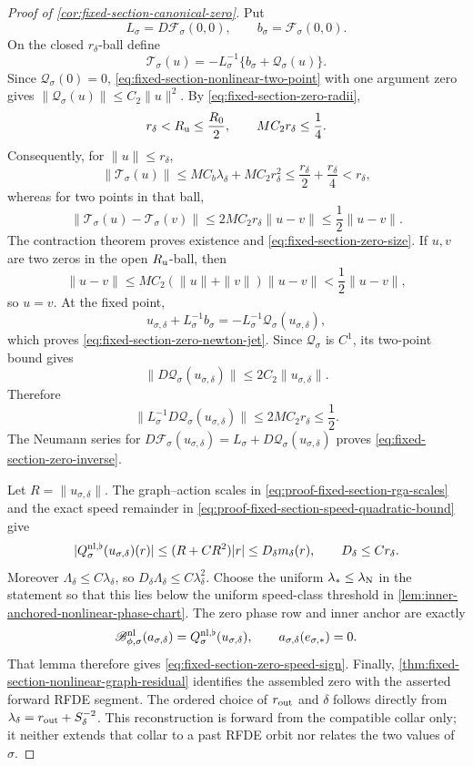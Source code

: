 \begin{proof}[Proof of
\cref{cor:fixed-section-canonical-zero}]
Put
\[
 L_\sigma=D\mathcal F_\sigma(0,0),
 \qquad b_\sigma=\mathcal F_\sigma(0,0).
\]
On the closed \(r_\delta\)-ball define
\begin{equation}
 \mathcal T_\sigma(u)
 =-L_\sigma^{-1}\{b_\sigma+\mathcal Q_\sigma(u)\}. \label{eq:fixed-section-zero-contraction}
\end{equation}
Since \(\mathcal Q_\sigma(0)=0\),
\cref{eq:fixed-section-nonlinear-two-point} with one argument zero gives
\(\|\mathcal Q_\sigma(u)\|\le C_2\|u\|^2\).  By
\cref{eq:fixed-section-zero-radii},
\[
 r_\delta<R_{\rm u}\le\frac{R_0}{2},
 \qquad
 MC_2r_\delta\le\frac14.
\]
Consequently, for \(\|u\|\le r_\delta\),
\[
 \|\mathcal T_\sigma(u)\|
 \le MC_b\lambda_\delta+MC_2r_\delta^2
 \le\frac{r_\delta}{2}+\frac{r_\delta}{4}
 <r_\delta,
\]
whereas for two points in that ball,
\[
 \|\mathcal T_\sigma(u)-\mathcal T_\sigma(v)\|
 \le2MC_2r_\delta\|u-v\|
 \le\frac12\|u-v\|.
\]
The contraction theorem proves existence and
\cref{eq:fixed-section-zero-size}.  If \(u,v\) are two zeros in the open
\(R_{\rm u}\)-ball, then
\[
 \|u-v\|
 \le MC_2(\|u\|+\|v\|)\|u-v\|
 <\frac12\|u-v\|,
\]
so \(u=v\).  At the fixed point,
\[
 u_{\sigma,\delta}+L_\sigma^{-1}b_\sigma
 =-L_\sigma^{-1}\mathcal Q_\sigma(u_{\sigma,\delta}),
\]
which proves \cref{eq:fixed-section-zero-newton-jet}.
Since \(\mathcal Q_\sigma\) is \(C^1\), its two-point bound gives
\[
 \|D\mathcal Q_\sigma(u_{\sigma,\delta})\|
 \le2C_2\|u_{\sigma,\delta}\|.
\]
Therefore
\[
 \|L_\sigma^{-1}
       D\mathcal Q_\sigma(u_{\sigma,\delta})\|
 \le2MC_2r_\delta\le\frac12.
\]
The Neumann series for
\(D\mathcal F_\sigma(u_{\sigma,\delta})
 =L_\sigma+D\mathcal Q_\sigma(u_{\sigma,\delta})\)
proves \cref{eq:fixed-section-zero-inverse}.

Let \(R=\|u_{\sigma,\delta}\|\).  The graph--action scales in
\cref{eq:proof-fixed-section-rga-scales} and the exact speed remainder in
\cref{eq:proof-fixed-section-speed-quadratic-bound} give
\[
 |Q_\sigma^{\rm nl,\flat}(u_{\sigma,\delta})(r)|
 \le (R+CR^2)|r|
 \le D_\delta m_\delta(r),
 \qquad D_\delta\le Cr_\delta.
\]
Moreover
\(\Lambda_\delta\le C\lambda_\delta\), so
\(D_\delta\Lambda_\delta\le C\lambda_\delta^2\).
Choose the uniform \(\lambda_*\le\lambda_{\rm N}\) in the statement so
that this lies below the uniform speed-class threshold in
\cref{lem:inner-anchored-nonlinear-phase-chart}.  The zero phase row and
inner anchor are exactly
\[
 \mathscr B_{\phi,\sigma}^{\rm nl}
       (a_{\sigma,\delta})
 =Q_\sigma^{\rm nl,\flat}(u_{\sigma,\delta}),
 \qquad
 a_{\sigma,\delta}(e_{\sigma,*})=0.
\]
That lemma therefore gives
\cref{eq:fixed-section-zero-speed-sign}.  Finally,
\cref{thm:fixed-section-nonlinear-graph-residual} identifies the assembled
zero with the asserted forward RFDE segment.  The ordered choice of
\(r_{\rm out}\) and \(\delta\) follows directly from
\(\lambda_\delta=r_{\rm out}+S_\delta^{-2}\).
This reconstruction is forward from the compatible collar only; it neither
extends that collar to a past RFDE orbit nor relates the two values of
\(\sigma\).
\end{proof}

